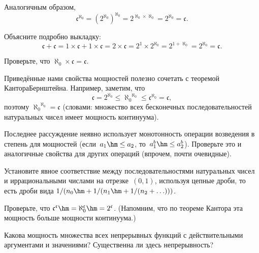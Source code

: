 Аналогичным образом,
        $$
\mathfrak{c}^{\aleph_0}= (2^{\aleph_0})^{\aleph_0}=
2^{\aleph_0 \times \aleph_0}= 2^{\aleph_0} = \mathfrak{c}.
        $$

\begin{problem}
Объясните подробно выкладку:
        $$
\mathfrak{c}+\mathfrak{c} = 1\times\mathfrak{c}+1\times\mathfrak{c}=
        2\times\mathfrak{c}=2^1\times 2^{\aleph_0} = 2^{1+\aleph_0} =
                              2^{\aleph_0} = \mathfrak{c}.
        $$
\end{problem}

\begin{problem}
Проверьте, что $\aleph_0 \times \mathfrak{c} = \mathfrak{c}$.
\end{problem}

\problskip
Приведённые нами свойства мощностей полезно сочетать с теоремой
Кантора\ч Бернштейна.
Например, заметим, что
        $$
\mathfrak{c} =
    2^{\aleph_0}
     \le {\aleph_0}^{\aleph_0}
        \le \mathfrak{c}^{\aleph_0}
           = \mathfrak{c},
        $$
поэтому ${\aleph_0}^{\aleph_0}= \mathfrak{c}$
(словами: множество всех бесконечных последовательностей
натуральных чисел имеет мощность континуума).

\begin{problem}
Последнее рассуждение неявно использует монотонность операции
возведения в степень для мощностей (если~$a_1\hm\le a_2$,
то~$a_1^b
\hm\le a_2^b$). Проверьте это и аналогичные свойства для других
операций (впрочем, почти очевидные).
\end{problem}

\begin{problem}
Установите явное соответствие между последовательностями
натуральных чисел и иррациональными числами на отрезке~$(0,1)$,
используя цепные дроби, то есть дроби вида
$1/(n_0\hm+1/(n_1\hm+1/(n_2+\ldots)))$.
\end{problem}

\begin{problem}
Проверьте, что
$\mathfrak{c}^\mathfrak{c}\hm=\aleph_0^\mathfrak{c}\hm=
2^\mathfrak{c}$. (Напомним, что по теореме Кантора эта
мощность больше мощности континуума.)
\end{problem}

\begin{problem}
Какова мощность множества всех непрерывных функций с действительными
аргументами и значениями? Существенна ли здесь непрерывность?
\end{problem}

